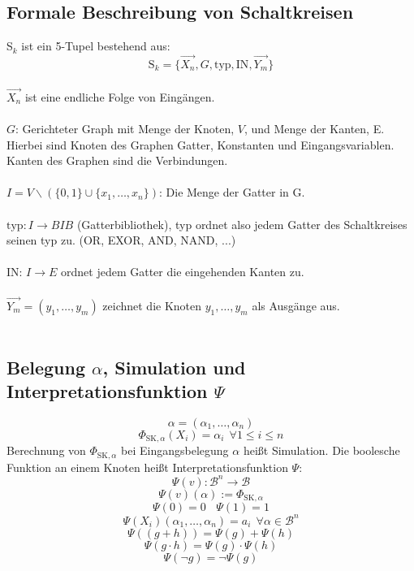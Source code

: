 \documentclass{scrartcl}[10pt]
\begin{document}
\subsection{Formale Beschreibung von Schaltkreisen}
S$_k$ ist ein 5-Tupel bestehend aus:\\
\[\text{S}_k = \{\overrightarrow{X_n}, G, \text{typ}, \text{IN}, \overrightarrow{Y_m}\}\]\\
$\overrightarrow{X_n}$ ist eine endliche Folge von Eing\"angen.\\ \\
$G$: Gerichteter Graph mit Menge der Knoten, $V$, und Menge der Kanten, E. Hierbei sind Knoten des Graphen Gatter, Konstanten und Eingangsvariablen. Kanten des Graphen sind die Verbindungen.\\ \\
$I = V\backslash(\{0,1\}\cup\{x_1,\dots,x_n\})$: Die Menge der Gatter in G.\\ \\
$\text{typ}: I \rightarrow BIB$ (Gatterbibliothek), typ ordnet also jedem Gatter des Schaltkreises seinen typ zu. (OR, EXOR, AND, NAND, ...)\\ \\
IN: $I \rightarrow E$ ordnet jedem Gatter die eingehenden Kanten zu.\\ \\
$\overrightarrow{Y_m} = (y_1, \dots, y_m)$ zeichnet die Knoten $y_1,\dots,y_m$ als Ausg\"ange aus.\\ \\
\newpage
\subsection{Belegung $\alpha$, Simulation und Interpretationsfunktion $\Psi$}
\[\alpha = (\alpha_1, \dots, \alpha_n)\]
\[\Phi_{\text{SK},\alpha}(X_i) = \alpha_i \ \ \forall 1 \leq i \leq n\]
Berechnung von $\Phi_{\text{SK},\alpha}$ bei Eingangsbelegung $\alpha$ hei\ss t Simulation. Die boolesche Funktion an einem Knoten hei\ss t Interpretationsfunktion $\Psi$:
\[\Psi(v): \mathcal{B}^n \rightarrow \mathcal{B}\]
\[\Psi(v)(\alpha):= \Phi_{\text{SK},\alpha}\]
\[\Psi(0) = 0 \ \ \ \ \Psi(1) = 1\]
\[\Psi(X_i)(\alpha_1,\dots,\alpha_n) = a_i \ \ \forall \alpha \in \mathcal{B}^n\]
\[\Psi((g+h)) = \Psi(g) + \Psi(h)\]
\[\Psi(g \cdot h) = \Psi(g) \cdot \Psi(h)\]
\[\Psi(\neg g) = \neg \Psi(g)\]
\end{document}
